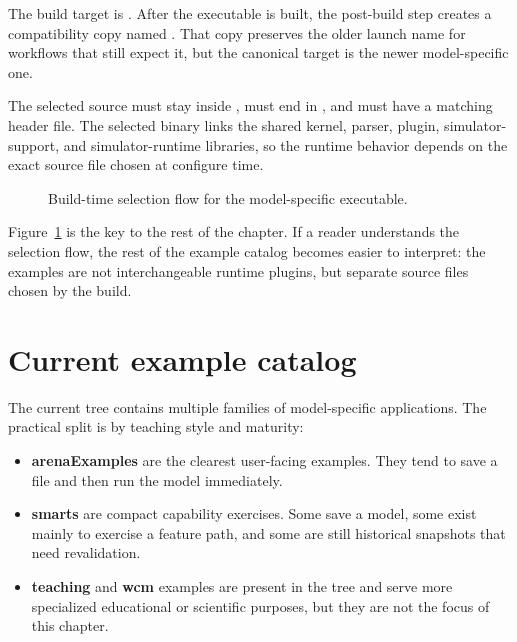 The build target is . After the executable is
built, the post-build step creates a compatibility copy named
. That copy preserves the older launch name
for workflows that still expect it, but the canonical target is the newer
model-specific one.

The selected source must stay inside
, must end in , and must
have a matching header file. The selected binary links the shared kernel,
parser, plugin, simulator-support, and simulator-runtime libraries, so the
runtime behavior depends on the exact source file chosen at configure time.

\begin{figure}[htbp]
\centering
\caption{Build-time selection flow for the model-specific executable.}
\label{fig:model-specific-selection-flow}
\end{figure}

Figure~\ref{fig:model-specific-selection-flow} is the key to the rest of the
chapter. If a reader understands the selection flow, the rest of the example
catalog becomes easier to interpret: the examples are not interchangeable
runtime plugins, but separate source files chosen by the build.

\section{Current example catalog}
\label{sec:model-specific-catalog}

The current tree contains multiple families of model-specific applications.
The practical split is by teaching style and maturity:
\begin{itemize}
\item \textbf{arenaExamples} are the clearest user-facing examples. They tend
to save a  file and then run the model immediately.
\item \textbf{smarts} are compact capability exercises. Some save a model, some
exist mainly to exercise a feature path, and some are still historical
snapshots that need revalidation.
\item \textbf{teaching} and \textbf{wcm} examples are present in the tree and
serve more specialized educational or scientific purposes, but they are not
the focus of this chapter.
\end{itemize}

